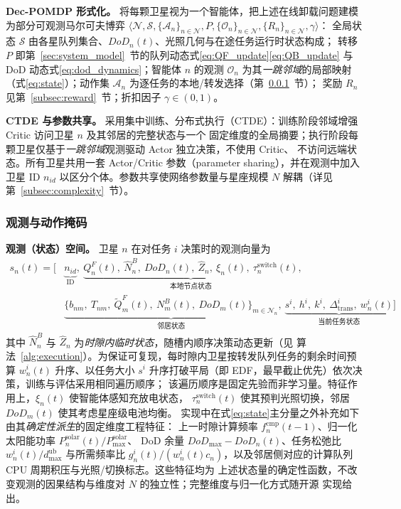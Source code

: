 \documentclass[a4paper,11pt]{article}
\begin{document}
\noindent\textbf{Dec-POMDP 形式化。}
将每颗卫星视为一个智能体，把上述在线卸载问题建模为部分可观测马尔可夫博弈
$\langle \mathcal{N}, \mathcal{S}, \{\mathcal{A}_n\}_{n\in\mathcal{N}}, P, \{\mathcal{O}_n\}_{n\in\mathcal{N}}, \{R_n\}_{n\in\mathcal{N}}, \gamma \rangle$：
全局状态 $\mathcal{S}$ 由各星队列集合、$DoD_n(t)$、光照几何与在途任务运行时状态构成；
转移 $P$ 即第~\ref{sec:system_model}~节的队列动态式\eqref{eq:QF_update}\eqref{eq:QB_update}
与 DoD 动态式\eqref{eq:dod_dynamics}；智能体 $n$ 的观测 $\mathcal{O}_n$ 为其\emph{一跳邻域}的局部映射
（式\eqref{eq:state}）；动作集 $\mathcal{A}_n$ 为逐任务的本地/转发选择（第~\ref{subsec:obs_action}~节）；
奖励 $R_n$ 见第~\ref{subsec:reward}~节；折扣因子 $\gamma\in(0,1)$。

\noindent\textbf{CTDE 与参数共享。}
采用集中训练、分布式执行（CTDE）：训练阶段邻域增强 Critic 访问卫星 $n$ 及其邻居的完整状态与一个
固定维度的全局摘要；执行阶段每颗卫星仅基于\emph{一跳邻域}观测驱动 Actor 独立决策，不使用 Critic、
不访问远端状态。所有卫星共用一套 Actor/Critic 参数（parameter sharing），并在观测中加入卫星
ID $n_{id}$ 以区分个体。参数共享使网络参数量与星座规模 $N$ 解耦（详见第~\ref{subsec:complexity}~节）。

\subsubsection{观测与动作掩码}
\label{subsec:obs_action}

\noindent\textbf{观测（状态）空间。}
卫星 $n$ 在对任务 $i$ 决策时的观测向量为
\begin{equation}
\begin{aligned}
s_n(t) = \Big[
&\underbrace{n_{id}}_{\text{ID}},\
\underbrace{Q^F_n(t),\ \hat{N}^B_n,\ DoD_n(t),\
\hat{Z}_n,\ \xi_n(t),\ \tau^{\mathrm{switch}}_n(t)}_{\text{本地节点状态}}, \\
&\underbrace{\{b_{nm},\ T_{nm},\ \tilde{Q}^F_m(t),\
N^B_m(t),\ DoD_m(t)\}_{m \in \mathcal{N}_n}}_{\text{邻居状态}},\
\underbrace{s^i,\ h^i,\ k^i,\ \Delta^i_{\mathrm{trans}},\
w^i_n(t)}_{\text{当前任务状态}}
\Big]
\label{eq:state}
\end{aligned}
\end{equation}
其中 $\hat{N}^B_n$ 与 $\hat{Z}_n$ 为\emph{时隙内临时状态}，随槽内顺序决策动态更新（见
算法~\ref{alg:execution}）。为保证可复现，每时隙内卫星按转发队列任务的剩余时间预算 $w^i_n(t)$
升序、以任务大小 $s^i$ 升序打破平局（即 EDF，最早截止优先）依次决策，训练与评估采用相同遍历顺序；
该遍历顺序是固定先验而非学习量。特征作用上，$\xi_n(t)$ 使智能体感知充放电状态，
$\tau^{\mathrm{switch}}_n(t)$ 使其预判光照切换，邻居 $DoD_m(t)$ 使其考虑星座级电池均衡。
实现中在式\eqref{eq:state}主分量之外补充如下由其\emph{确定性派生}的固定维度工程特征：
上一时隙计算频率 $f^{\mathrm{cmp}}_n(t\!-\!1)$、归一化太阳能功率 $P^{\mathrm{solar}}_n(t)/P^{\mathrm{solar}}_{\max}$、
DoD 余量 $DoD_{\max}-DoD_n(t)$、任务松弛比 $w^i_n(t)/d^{\mathrm{ub}}_{\max}$ 与所需频率比
$g^i_n(t)/(w^i_n(t)c_n)$，以及邻居侧对应的计算队列 CPU 周期积压与光照/切换标志。这些特征均为
上述状态量的确定性函数，不改变观测的因果结构与维度对 $N$ 的独立性；完整维度与归一化方式随开源
实现给出。
\end{document}
